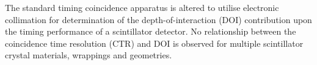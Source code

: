 The standard timing coincidence apparatus is altered to utilise electronic collimation for determination of the depth-of-interaction (DOI) contribution upon the timing performance of a scintillator detector. No relationship between the coincidence time resolution (CTR) and DOI is observed for multiple scintillator crystal materials, wrappings and geometries. 

